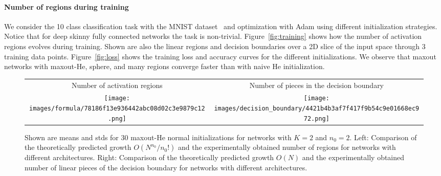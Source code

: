 \documentclass{article}
\theoremstyle{definition}
\newcommand{\nin}{n_0}
\begin{document}
\paragraph{Number of regions during training} 
We consider the 10 class classification task with the MNIST dataset~\citep{lecun2010mnist} and optimization with Adam \citep{DBLP:journals/corr/KingmaB14} using different initialization strategies. 
Notice that for deep skinny fully connected networks the task is non-trivial. 
Figure~\ref{fig:training} shows how the number of activation regions evolves during training. Shown are also the linear regions and decision boundaries over a 2D slice of the input space through 3 training data points. Figure~\ref{fig:loss} shows the training loss and accuracy curves for the different initializations. We observe that maxout networks with maxout-He, sphere, and many regions converge faster than with naive He initialization.

\begin{figure}
    \centering
    \begin{tabular}{cc}
        {\small Number of activation regions} & {\small Number of pieces in the decision boundary}\\
        \texttt{[image: images/formula/78186f13e936442abc08d02c3e9879c12.png]}&
        \texttt{[image: images/decision\_boundary/4421b4b3af7f417f9b54c9e01668ec972.png]}
    \end{tabular}
    \caption{Shown are means and stds for 30 maxout-He normal initializations for networks with $K = 2$ and $\nin = 2$. Left: Comparison of the theoretically predicted growth $O(N^{\nin} / \nin!)$ and the experimentally obtained number of regions for networks with different architectures. Right: Comparison of the theoretically predicted growth $O(N)$ and the experimentally obtained number of linear pieces of the decision boundary for networks with different architectures.
    }
    \label{fig:formula} 
\end{figure}
    
\end{document}
